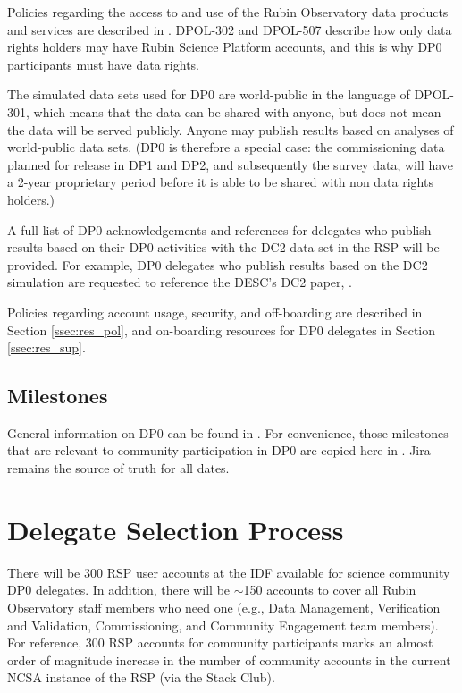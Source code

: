 \documentclass[DM,lsstdraft,authoryear,toc]{lsstdoc}
\begin{document}
Policies regarding the access to and use of the Rubin Observatory data products and services are described in .
DPOL-302 and DPOL-507 describe how only data rights holders may have Rubin Science Platform accounts, and this is why DP0 participants must have data rights.

The simulated data sets used for DP0 are world-public in the language of DPOL-301, which means that the data can be shared with anyone, but does not mean the data will be served publicly.
Anyone may publish results based on analyses of world-public data sets.
(DP0 is therefore a special case: the commissioning data planned for release in DP1 and DP2, and subsequently the survey data, will have a 2-year proprietary period before it is able to be shared with non data rights holders.)

A full list of DP0 acknowledgements and references for delegates who publish results based on their DP0 activities with the DC2 data set in the RSP will be provided. 
For example, DP0 delegates who publish results based on the DC2 simulation are requested to reference the DESC's DC2 paper, \citet{2020arXiv201005926L}.

Policies regarding account usage, security, and off-boarding are described in Section \ref{ssec:res_pol}, and on-boarding resources for DP0 delegates in Section \ref{ssec:res_sup}. 

\subsection{Milestones}
General information on DP0 can be found in .
For convenience, those milestones  that are relevant to community participation in DP0 are copied here in . 
Jira remains the source of truth for all dates. 


\section{Delegate Selection Process}\label{sec:sel}

There will be 300 RSP user accounts at the IDF available for science community DP0 delegates.
In addition, there will be $\sim$150 accounts to cover all Rubin Observatory staff members who need one (e.g., Data Management, Verification and Validation, Commissioning, and Community Engagement team members).
For reference, 300 RSP accounts for community participants marks an almost order of magnitude increase in the number of community accounts in the current NCSA instance of the RSP (via the Stack Club).
\end{document}

